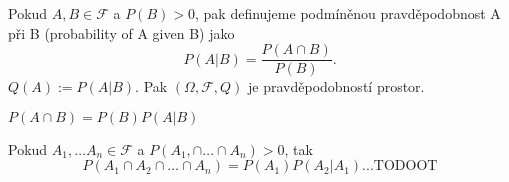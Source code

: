 \documentclass[../main.tex]{subfiles}
\begin{document}
\begin{definition}

    Pokud $A,B \in \mathcal{F}$ a $P(B) > 0$, pak definujeme podmíněnou pravděpodobnost A při B (probability of A given B) jako
    \[P(A|B) = \frac{P(A\cap B)}{P(B)}.\]
    $Q(A):= P(A|B).$ Pak $(\Omega, \mathcal{F},Q)$ je pravděpodobností prostor.
\end{definition}

\begin{definition}
    $P(A\cap B) = P(B)P(A|B)$
\end{definition}

\begin{theorem}
    Pokud $A_1,\dots A_n \in \mathcal{F}$ a $P(A_1, \cap \dots \cap A_n)> 0$, tak
    \[P(A_1\cap A_2 \cap \dots \cap A_n) = P(A_1)P(A_2|A_1) ... \text{TODOOT}\]
\end{theorem}
\end{document}
